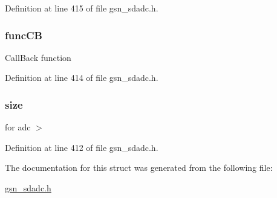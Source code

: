 Definition at line 415 of file gsn\_\-sdadc.h.

\hypertarget{a00215_ade4c313eb150e6fea7b5cd4e904b9869}{
\subsubsection[{funcCB}]{ {\bf funcCB}}}
\label{a00215_ade4c313eb150e6fea7b5cd4e904b9869}
CallBack function 

Definition at line 414 of file gsn\_\-sdadc.h.

\hypertarget{a00215_a68890417cb73114517d0d8c594bd282e}{
\subsubsection[{size}]{ {\bf size}}}
\label{a00215_a68890417cb73114517d0d8c594bd282e}
for adc $>$ 

Definition at line 412 of file gsn\_\-sdadc.h.



The documentation for this struct was generated from the following file:\begin{DoxyCompactItemize}
\item 
\hyperlink{a00583}{gsn\_\-sdadc.h}\end{DoxyCompactItemize}
